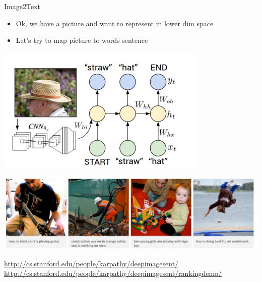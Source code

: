 \documentclass{beamer}
\begin{document}
\begin{frame}{Image2Text}
	\begin{itemize}
		\item Ok, we have a picture and want to represent in lower dim space
		\item Let's try to map picture to words sentence
	\end{itemize}
	\begin{center}
		\includegraphics[scale=0.3]{img/nt}
		
		\includegraphics[scale=0.3]{img/ntw}
	\end{center}

	\href{http://cs.stanford.edu/people/karpathy/deepimagesent/}{http://cs.stanford.edu/people/karpathy/deepimagesent/}
	\href{http://cs.stanford.edu/people/karpathy/deepimagesent/rankingdemo/}{http://cs.stanford.edu/people/karpathy/deepimagesent/rankingdemo/}
\end{frame}
\end{document}
